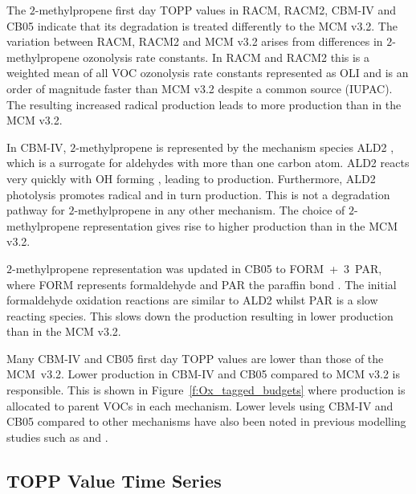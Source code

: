 The $2$-methylpropene first day TOPP values in RACM, RACM2, CBM-IV and CB05 indicate that its degradation is treated differently to the MCM v3.2. 
The variation between RACM, RACM2 and MCM v3.2 arises from differences in $2$-methylpropene ozonolysis rate constants.
In RACM and RACM2 this is a weighted mean of all VOC ozonolysis rate constants represented as OLI \citep{Stockwell:1997, Goliff:2013} and is an order of magnitude faster than MCM v3.2 despite a common source (IUPAC).
The resulting increased radical production leads to more  production than in the MCM v3.2.

In CBM-IV, $2$-methylpropene is represented by the mechanism species ALD2 \citep{Hogo:1989}, which is a surrogate for aldehydes with more than one carbon atom. 
ALD2 reacts very quickly with OH forming , leading to  production. 
Furthermore, ALD2 photolysis promotes radical and in turn  production. 
This is not a degradation pathway for $2$-methylpropene in any other mechanism. 
The choice of $2$-methylpropene representation gives rise to higher  production than in the MCM v3.2.

$2$-methylpropene representation was updated in CB05 to \mbox{FORM + $3$ PAR}, where FORM represents formaldehyde and PAR the paraffin  bond \citep{Yarwood:2005}. 
The initial formaldehyde oxidation reactions are similar to ALD2 whilst PAR is a slow reacting species. 
This slows down the  production resulting in lower  production than in the MCM v3.2.

Many CBM-IV and CB05 first day TOPP values are lower than those of the \mbox{MCM v3.2}. 
Lower  production in CBM-IV and CB05 compared to MCM v3.2 is responsible.
This is shown in \mbox{Figure \ref{f:Ox_tagged_budgets}} where  production is allocated to parent VOCs in each mechanism.
Lower  levels using CBM-IV and CB05 compared to other mechanisms have also been noted in previous modelling studies such as \citet{Luecken:2008, Emmerson:2009} and \citet{Saylor:2012}.

\subsection{TOPP Value Time Series} \label{ss:profiles} %

